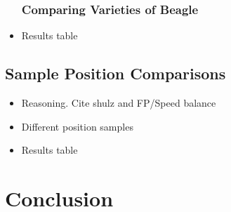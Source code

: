\documentclass[10pt]{beamer}
\begin{document}
\begin{NoHyper}
\begin{frame}
  \begin{itemize}
  \frametitle{Comparing Varieties of Beagle}
  \item<1-> Results table
  \end{itemize}
\end{frame}

\subsection{Sample Position Comparisons}
\begin{frame}
  \begin{itemize}
  \frametitle{Fingerprint Sampling Varieties}
  \item<1-> Reasoning. Cite shulz and FP/Speed balance
  \item<2-> Different position samples
  \end{itemize}
\end{frame}

\begin{frame}
  \begin{itemize}
  \frametitle{Fingerprint Sampling Varieties}
  \item<1-> Results table
  \end{itemize}
\end{frame}

\section{Conclusion}



\end{NoHyper}
\end{document}
